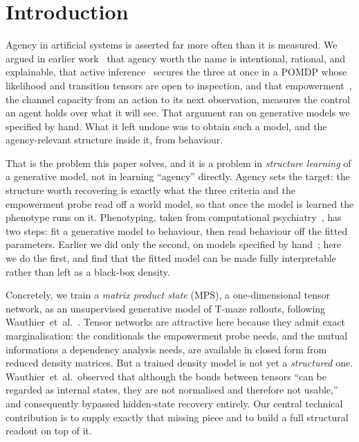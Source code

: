 \documentclass[runningheads]{llncs}
\begin{document}
\section{Introduction}\label{sec:intro}

Agency in artificial systems is asserted far more often than it is measured. We argued
in earlier work~\cite{wilsonAgency2025} that agency worth the name is intentional,
rational, and explainable, that active inference~\cite{parr2022} secures the three at
once in a POMDP whose likelihood and transition tensors are open to inspection, and that
empowerment~\cite{klyubin2005,salge2014}, the channel capacity from an action to its
next observation, measures the control an agent holds over what it will see. That
argument ran on generative models we specified by hand. What it left undone was to
obtain such a model, and the agency-relevant structure inside it, from behaviour.

That is the problem this paper solves, and it is a problem in \emph{structure learning}
of a generative model, not in learning ``agency'' directly. Agency sets the target: the
structure worth recovering is exactly what the three criteria and the empowerment probe
read off a world model, so that once the model is learned the phenotype runs on it. Phenotyping,
taken from computational psychiatry~\cite{montague2012,schwartenbeck2016}, has two
steps: fit a generative model to behaviour, then read behaviour off the fitted
parameters. Earlier we did only the second, on models specified by
hand~\cite{wilsonAgency2025}; here we do the first, and find that the fitted model can
be made fully interpretable rather than left as a black-box density.

Concretely, we train a \emph{matrix product state} (MPS), a one-dimensional tensor
network, as an unsupervised generative model of T-maze rollouts, following
Wauthier~et~al.~\cite{wauthier2022}. Tensor networks are attractive here because they
admit exact marginalisation: the conditionals the empowerment probe needs, and the
mutual informations a dependency analysis needs, are available in closed form from
reduced density matrices. But a trained density model is not yet a \emph{structured}
one. Wauthier~et~al.\ observed that although the bonds between tensors ``can be
regarded as internal states, they are not normalised and therefore not usable,'' and
consequently bypassed hidden-state recovery entirely. Our central technical
contribution is to supply exactly that missing piece and to build a full structural
readout on top of it.
\end{document}
